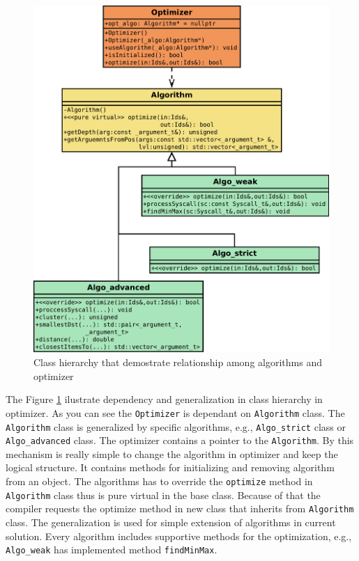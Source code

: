 \begin{figure}[H]
	\centering
	\includegraphics[width=\textwidth]{obrazky-figures/class/algo.pdf}
	\caption{Class hierarchy that demostrate relationship among algorithms and optimizer}
	\label{fig:class:algo}
\end{figure}
\pagebreak

The Figure \ref{fig:class:algo} ilustrate dependency and generalization in class
hierarchy in optimizer. As you can see the \texttt{Optimizer} is dependant on
\texttt{Algorithm} class. The \texttt{Algorithm} class is generalized by
specific algorithms, e.g., \texttt{Algo\_strict} class or
\texttt{Algo\_advanced} class. The optimizer contains a pointer to the
\texttt{Algorithm}. By this mechanism is really simple to change the algorithm
in optimizer and keep the logical structure. It contains methods for
initializing and removing algorithm from an object. The algorithms has to
override the \texttt{optimize} method in \texttt{Algorithm} class thus is pure
virtual in the base class. Because of that the compiler requests the optimize
method in new class that inherits from \texttt{Algorithm} class. The
generalization is used for simple extension of algorithms in current solution.
Every algorithm includes supportive methods for the optimization, e.g.,
\texttt{Algo\_weak} has implemented method \texttt{findMinMax}.

